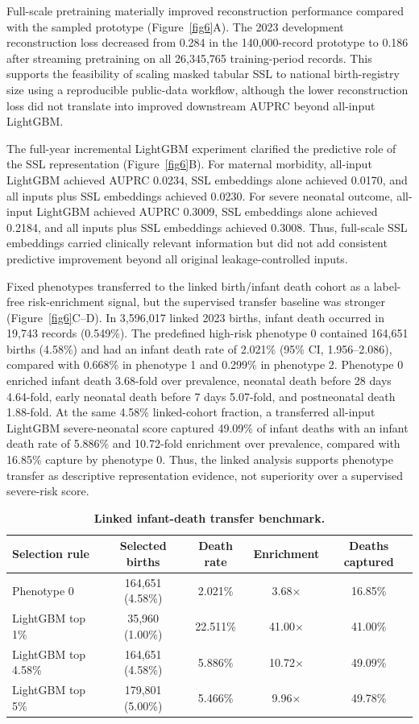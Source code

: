 \documentclass[pdflatex,sn-vancouver-num]{sn-jnl}
\begin{document}
Full-scale pretraining materially improved reconstruction performance compared with the sampled prototype (Figure~\ref{fig6}A). The 2023 development reconstruction loss decreased from 0.284 in the 140,000-record prototype to 0.186 after streaming pretraining on all 26,345,765 training-period records. This supports the feasibility of scaling masked tabular SSL to national birth-registry size using a reproducible public-data workflow, although the lower reconstruction loss did not translate into improved downstream AUPRC beyond all-input LightGBM.

The full-year incremental LightGBM experiment clarified the predictive role of the SSL representation (Figure~\ref{fig6}B). For maternal morbidity, all-input LightGBM achieved AUPRC 0.0234, SSL embeddings alone achieved 0.0170, and all inputs plus SSL embeddings achieved 0.0230. For severe neonatal outcome, all-input LightGBM achieved AUPRC 0.3009, SSL embeddings alone achieved 0.2184, and all inputs plus SSL embeddings achieved 0.3008. Thus, full-scale SSL embeddings carried clinically relevant information but did not add consistent predictive improvement beyond all original leakage-controlled inputs.

Fixed phenotypes transferred to the linked birth/infant death cohort as a label-free risk-enrichment signal, but the supervised transfer baseline was stronger (Figure~\ref{fig6}C--D). In 3,596,017 linked 2023 births, infant death occurred in 19,743 records (0.549\%). The predefined high-risk phenotype 0 contained 164,651 births (4.58\%) and had an infant death rate of 2.021\% (95\% CI, 1.956--2.086), compared with 0.668\% in phenotype 1 and 0.299\% in phenotype 2. Phenotype 0 enriched infant death 3.68-fold over prevalence, neonatal death before 28 days 4.64-fold, early neonatal death before 7 days 5.07-fold, and postneonatal death 1.88-fold. At the same 4.58\% linked-cohort fraction, a transferred all-input LightGBM severe-neonatal score captured 49.09\% of infant deaths with an infant death rate of 5.886\% and 10.72-fold enrichment over prevalence, compared with 16.85\% capture by phenotype 0. Thus, the linked analysis supports phenotype transfer as descriptive representation evidence, not superiority over a supervised severe-risk score.

\begin{table}[!htbp]
\caption{\textbf{Linked infant-death transfer benchmark.}}
\label{tab:linked-transfer}
\centering
\scriptsize
\setlength{\tabcolsep}{3pt}
\begin{tabular*}{\textwidth}{@{\extracolsep{\fill}}lcccc@{}}
\toprule
Selection rule & Selected births & Death rate & Enrichment & Deaths captured \\
\midrule
Phenotype 0 & 164,651 (4.58\%) & 2.021\% & 3.68$\times$ & 16.85\% \\
LightGBM top 1\% & 35,960 (1.00\%) & 22.511\% & 41.00$\times$ & 41.00\% \\
LightGBM top 4.58\% & 164,651 (4.58\%) & 5.886\% & 10.72$\times$ & 49.09\% \\
LightGBM top 5\% & 179,801 (5.00\%) & 5.466\% & 9.96$\times$ & 49.78\% \\
\bottomrule
\end{tabular*}
\end{table}
\end{document}
